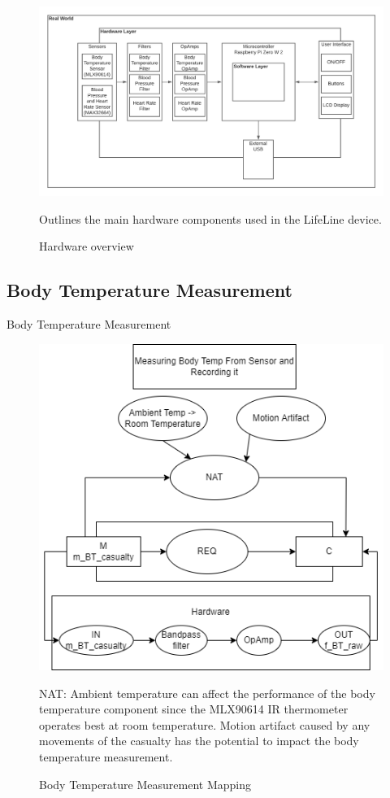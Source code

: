 \documentclass{article}
\newcounter{mnum}
\newcommand{\mthemnum}{M\themnum}
\begin{document}
\begin{description}
    \begin{figure}[!htb]
    	\centering
    	\includegraphics[width=1\linewidth]{component overview rev2.png}
    	\caption{Hardware overview}{Outlines the main hardware components used in the LifeLine device.}
    \end{figure}
    

    \newpage
    \subsection {Body Temperature Measurement} 
    \item [\refstepcounter{mnum} \mthemnum \label{BT_M}:] Body Temperature Measurement\\
    
    \begin{figure}[!htb]
    	\centering
    	\includegraphics[width=0.5\linewidth]{mccharts-BodyTempModule.drawio.png}
    	\caption{Body Temperature Measurement Mapping}
    	{NAT: Ambient temperature can affect the performance of the body temperature component since the MLX90614 IR thermometer operates best at room temperature. Motion artifact caused by any movements of the casualty has the potential to impact the body temperature measurement.}
    \end{figure}    
        

\end{description}
\end{document}
